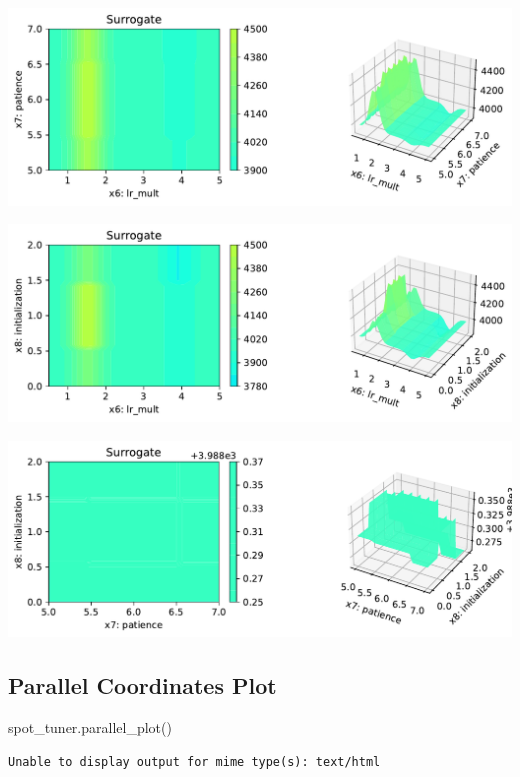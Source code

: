 \documentclass[
  letterpaper,
  DIV=11,
  numbers=noendperiod]{scrreprt}
\newenvironment{Shaded}{\begin{snugshade}}{\end{snugshade}}
\newcommand{\NormalTok}[1]{\textcolor[rgb]{0.00,0.23,0.31}{#1}}
\begin{document}
\includegraphics{031_spot_lightning_linear_diabetes_files/figure-pdf/cell-19-output-27.pdf}

\includegraphics{031_spot_lightning_linear_diabetes_files/figure-pdf/cell-19-output-28.pdf}

\includegraphics{031_spot_lightning_linear_diabetes_files/figure-pdf/cell-19-output-29.pdf}

\subsection{Parallel Coordinates Plot}\label{parallel-coordinates-plot}

\begin{Shaded}
\begin{Highlighting}[]
\NormalTok{spot\_tuner.parallel\_plot()}
\end{Highlighting}
\end{Shaded}

\begin{verbatim}
Unable to display output for mime type(s): text/html
\end{verbatim}
\end{document}
